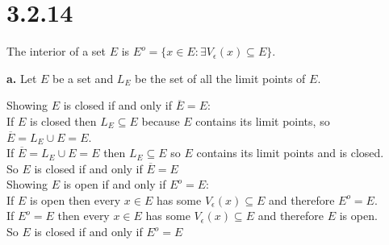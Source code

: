 \documentclass{article}
\begin{document}
\newpage
\section*{3.2.14}
\begin{center}
    The interior of a set $E$ is $E^o =\{x\in E :\exists V_{\epsilon} (x)\subseteq E\}$.
\end{center}

{\Large \textbf{a.}} Let $E$ be a set and $L_E$ be the set of all the limit points of $E$.
\begin{center}
    \doublespacing
    Showing $E$ is closed if and only if $\overline{E} = E$:
    \\If $E$ is closed then $L_E\subseteq E$ because $E$ contains its limit points, so $\overline{E} = L_E\cup E = E$.
    \\If $\overline{E} = L_E\cup E = E$ then $L_E\subseteq E$ so $E$ contains its limit points and is closed.
    \\So $E$ is closed if and only if $\overline{E} = E$ \qedsymbol
    \\Showing $E$ is open if and only if $E^o = E$:
    \\If $E$ is open then every $x\in E$ has some $V_{\epsilon} (x)\subseteq E$ and therefore $E^o = E$.
    \\If $E^o = E$ then every $x\in E$ has some $V_{\epsilon} (x)\subseteq E$ and therefore $E$ is open.
    \\So $E$ is closed if and only if $E^o = E$ \qedsymbol
\end{center}
\end{document}
